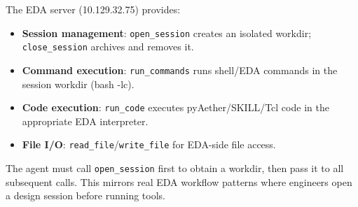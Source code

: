 The EDA server (10.129.32.75) provides:
\begin{itemize}
    \item \textbf{Session management}: \texttt{open\_session} creates an isolated workdir; \texttt{close\_session} archives and removes it.
    \item \textbf{Command execution}: \texttt{run\_commands} runs shell/EDA commands in the session workdir (bash -lc).
    \item \textbf{Code execution}: \texttt{run\_code} executes pyAether/SKILL/Tcl code in the appropriate EDA interpreter.
    \item \textbf{File I/O}: \texttt{read\_file}/\texttt{write\_file} for EDA-side file access.
\end{itemize}

The agent must call \texttt{open\_session} first to obtain a workdir, then pass it to all subsequent calls. This mirrors real EDA workflow patterns where engineers open a design session before running tools.
